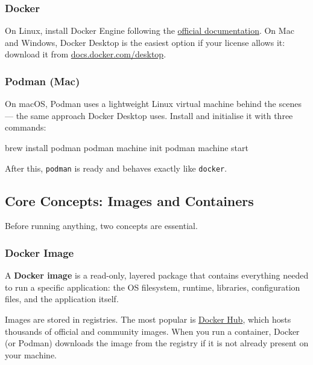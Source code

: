 \documentclass[11pt,american,a4paper,openany]{book}
\newenvironment{Shaded}{}{}
\newcommand{\NormalTok}[1]{#1}
\begin{document}
\subsubsection{Docker}\label{docker}

On Linux, install Docker Engine following the
\href{https://docs.docker.com/engine/install/}{official documentation}.
On Mac and Windows, Docker Desktop is the easiest option if your license
allows it: download it from
\href{https://docs.docker.com/desktop/}{docs.docker.com/desktop}.

\subsubsection{Podman (Mac)}\label{podman-mac}

On macOS, Podman uses a lightweight Linux virtual machine behind the
scenes --- the same approach Docker Desktop uses. Install and initialise
it with three commands:

\begin{Shaded}
\begin{Highlighting}[]
\NormalTok{brew install podman}
\NormalTok{podman machine init}
\NormalTok{podman machine start}
\end{Highlighting}
\end{Shaded}

After this, \texttt{podman} is ready and behaves exactly like
\texttt{docker}.

\subsection{Core Concepts: Images and
Containers}\label{core-concepts-images-and-containers}

Before running anything, two concepts are essential.

\subsubsection{Docker Image}\label{docker-image}

A \textbf{Docker image} is a read-only, layered package that contains
everything needed to run a specific application: the OS filesystem,
runtime, libraries, configuration files, and the application itself.

Images are stored in registries. The most popular is
\href{https://hub.docker.com}{Docker Hub}, which hosts thousands of
official and community images. When you run a container, Docker (or
Podman) downloads the image from the registry if it is not already
present on your machine.
\end{document}
